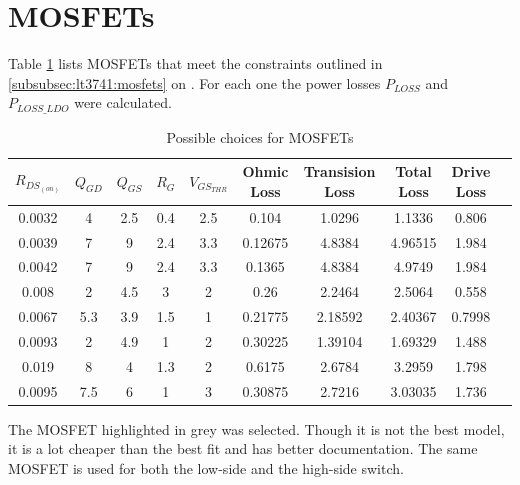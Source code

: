 \section{MOSFETs}
\label{appendix:mosfets}

Table     \ref{tab:circuit:buck:mosfet}     lists    MOSFETs     that     meet
the    constraints     outlined    in     \ref{subsubsec:lt3741:mosfets}    on
\pageref{subsubsec:lt3741:mosfets}.  For each one  the power losses $P_{LOSS}$
and $P_{LOSS\_LDO}$ were calculated.

\begin{table}[th!]
    \begin{center}
        \caption{Possible choices for MOSFETs}
        \label{tab:circuit:buck:mosfet}
        \begin{tabular}{cccccccccc}
            \toprule
            $R_{DS_{(on)}}$ & $Q_{GD}$ & $Q_{GS}$ & $R_G$ & $V_{GS_{THR}}$ & Ohmic Loss & Transision Loss & Total Loss & Drive Loss \\
            \midrule
            0.0032          & 4        & 2.5      & 0.4   & 2.5            & 0.104      & 1.0296          & 1.1336     & 0.806 \\
            0.0039          & 7        & 9        & 2.4   & 3.3            & 0.12675    & 4.8384          & 4.96515    & 1.984 \\
            0.0042          & 7        & 9        & 2.4   & 3.3            & 0.1365     & 4.8384          & 4.9749     & 1.984 \\
            0.008           & 2        & 4.5      & 3     & 2              & 0.26       & 2.2464          & 2.5064     & 0.558 \\
            0.0067          & 5.3      & 3.9      & 1.5   & 1              & 0.21775    & 2.18592         & 2.40367    & 0.7998 \\
            \rowcolor{lightgray}
            0.0093          & 2        & 4.9      & 1     & 2              & 0.30225    & 1.39104         & 1.69329    & 1.488 \\
            0.019           & 8        & 4        & 1.3   & 2              & 0.6175     & 2.6784          & 3.2959     & 1.798 \\
            0.0095          & 7.5      & 6        & 1     & 3              & 0.30875    & 2.7216          & 3.03035    & 1.736 \\
            \bottomrule
        \end{tabular}
    \end{center}
\end{table}


The MOSFET highlighted in grey was selected.  Though it is not the best model,
it is a lot  cheaper than the best fit and  has better documentation. The same
MOSFET is used for both the low-side and the high-side switch.

